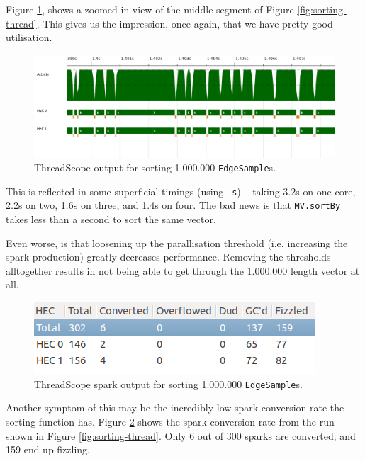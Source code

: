 \documentclass[12pt, a4paper]{article}
\begin{document}
Figure \ref{fig:sorting-thread-zoomed}, shows a zoomed in view of the middle segment of Figure \ref{fig:sorting-thread}.
This gives us the impression, once again, that we have pretty good utilisation.

 \begin{figure}[h!]
  \centering
  \includegraphics[width=0.85\linewidth]{../threadscope/sorting/sorting-final-zoom}
  \caption{ThreadScope output for sorting 1.000.000 \texttt{EdgeSample}s.}
  \label{fig:sorting-thread-zoomed}
\end{figure}

This is reflected in some superficial timings (using \texttt{-s}) -- taking 3.2s on one core, 2.2s on two, 1.6s on three, and 1.4s on four. The bad news is that \texttt{MV.sortBy} takes less than a second to sort the same vector.

Even worse, is that loosening up the parallisation threshold (i.e. increasing the spark production)
greatly decreases performance. Removing the thresholds alltogether results in not being able to get
 through the 1.000.000 length vector at all.
 \begin{figure}[h!]
  \centering
  \includegraphics[width=0.6\linewidth]{../threadscope/sorting/sorting-final-sparks}
  \caption{ThreadScope spark output for sorting 1.000.000 \texttt{EdgeSample}s.}
  \label{fig:sorting-thread-sparks}
\end{figure}

Another symptom of this may be the incredibly low spark conversion rate the sorting function has.
Figure \ref{fig:sorting-thread-sparks} shows the spark conversion rate from the run shown in
Figure \ref{fig:sorting-thread}. Only 6 out of 300 sparks are converted, and 159 end up fizzling.
\end{document}
